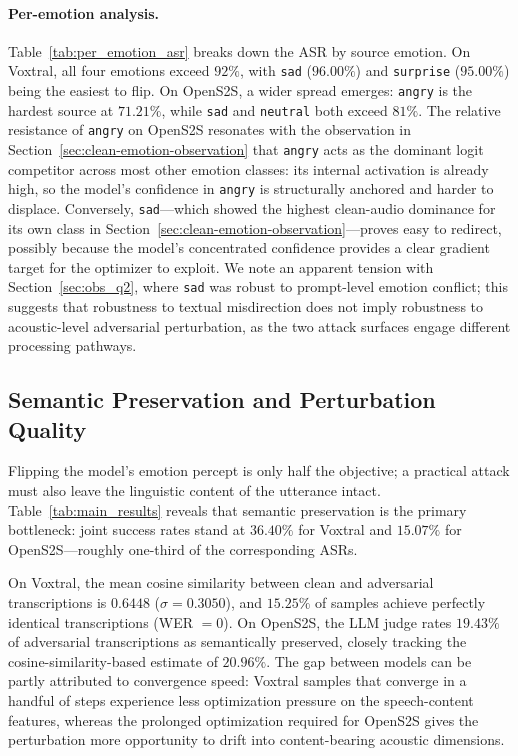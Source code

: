 \paragraph{Per-emotion analysis.}
Table~\ref{tab:per_emotion_asr} breaks down the ASR by source emotion.
On Voxtral, all four emotions exceed $92\%$, with \texttt{sad} ($96.00\%$) and \texttt{surprise} ($95.00\%$) being the easiest to flip.
On OpenS2S, a wider spread emerges: \texttt{angry} is the hardest source at $71.21\%$, while \texttt{sad} and \texttt{neutral} both exceed $81\%$.
The relative resistance of \texttt{angry} on OpenS2S resonates with the observation in Section~\ref{sec:clean-emotion-observation} that \texttt{angry} acts as the dominant logit competitor across most other emotion classes: its internal activation is already high, so the model's confidence in \texttt{angry} is structurally anchored and harder to displace.
Conversely, \texttt{sad}---which showed the highest clean-audio dominance for its own class in Section~\ref{sec:clean-emotion-observation}---proves easy to redirect, possibly because the model's concentrated confidence provides a clear gradient target for the optimizer to exploit.
We note an apparent tension with Section~\ref{sec:obs_q2}, where \texttt{sad} was robust to prompt-level emotion conflict; this suggests that robustness to textual misdirection does not imply robustness to acoustic-level adversarial perturbation, as the two attack surfaces engage different processing pathways.


\subsection{Semantic Preservation and Perturbation Quality}
\label{sec:exp_quality}

Flipping the model's emotion percept is only half the objective; a practical attack must also leave the linguistic content of the utterance intact.
Table~\ref{tab:main_results} reveals that semantic preservation is the primary bottleneck: joint success rates stand at $36.40\%$ for Voxtral and $15.07\%$ for OpenS2S---roughly one-third of the corresponding ASRs.

On Voxtral, the mean cosine similarity between clean and adversarial transcriptions is $0.6448$ ($\sigma = 0.3050$), and $15.25\%$ of samples achieve perfectly identical transcriptions (WER $= 0$).
On OpenS2S, the LLM judge rates $19.43\%$ of adversarial transcriptions as semantically preserved, closely tracking the cosine-similarity-based estimate of $20.96\%$.
The gap between models can be partly attributed to convergence speed: Voxtral samples that converge in a handful of steps experience less optimization pressure on the speech-content features, whereas the prolonged optimization required for OpenS2S gives the perturbation more opportunity to drift into content-bearing acoustic dimensions.

